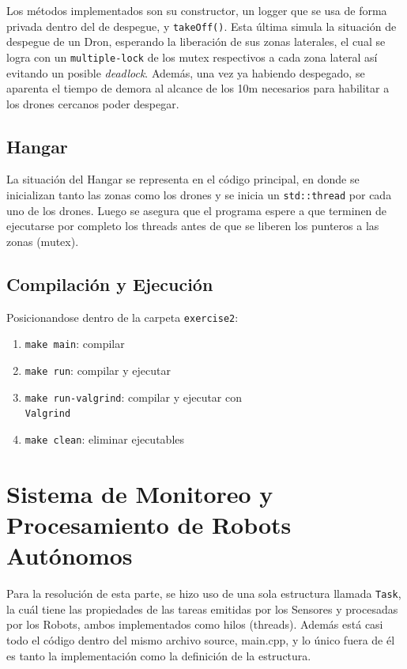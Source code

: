 \documentclass[11pt, a4paper]{article}
\begin{document}
\begin{multicols}{2}
Los métodos implementados son su constructor, un logger que se usa de forma privada dentro del de despegue, y \lstinline|takeOff()|. Esta última simula la situación de despegue de un Dron, esperando la liberación de sus zonas laterales, el cual se logra con un \lstinline|multiple-lock| de los mutex respectivos a cada zona lateral así evitando un posible \textit{deadlock}. Además, una vez ya habiendo despegado, se aparenta el tiempo de demora al alcance de los 10m necesarios para habilitar a los drones cercanos poder despegar.

\subsection{Hangar}

La situación del Hangar se representa en el código principal, en donde se inicializan tanto las zonas como los drones y se inicia un \lstinline|std::thread| por cada uno de los drones. Luego se asegura que el programa espere a que terminen de ejecutarse por completo los threads antes de que se liberen los punteros a las zonas (mutex).

\subsection{Compilación y Ejecución}

Posicionandose dentro de la carpeta \lstinline|exercise2|:

\begin{enumerate}[label=\roman*.]
    \item \lstinline|make main|: compilar
    \item \lstinline|make run|: compilar y ejecutar
    \item \lstinline|make run-valgrind|: compilar y ejecutar con \\ \lstinline|Valgrind|
    \item \lstinline|make clean|: eliminar ejecutables
\end{enumerate}

\newpage

\section{Sistema de Monitoreo y Procesamiento de Robots Autónomos}

Para la resolución de esta parte, se hizo uso de una sola estructura llamada \lstinline|Task|, la cuál tiene las propiedades de las tareas emitidas por los Sensores y procesadas por los Robots, ambos implementados como hilos (threads). Además está casi todo el código dentro del mismo archivo source, main.cpp, y lo único fuera de él es tanto la implementación como la definición de la estructura.


\end{multicols}
\end{document}
